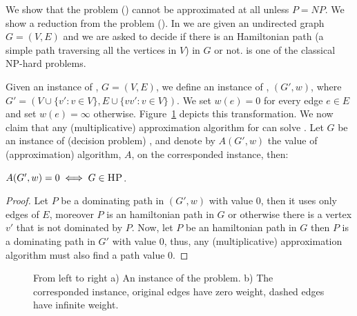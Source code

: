 We show that the \ProblemPath{} problem (\ProbPath{}) cannot be approximated at all
unless $P = NP$.
We show a reduction from the \ProblemHam{} problem (\ProbHam{}).
In \ProbHam{} we are given an undirected graph $G = (V, E)$ and we are 
asked to decide if there is an Hamiltonian path 
(a simple path traversing all the vertices in $V$) in $G$ or not.
\ProbHam{} is one of the classical NP-hard problems.

Given an instance of \ProbHam{}, $G = (V, E)$, we define an instance of \ProbPath{},
$(G', w)$, where $G' = (V \cup \{v' : v \in V\}, E \cup \{vv' : v \in V\})$.
We set $w(e) = 0$ for every edge $e \in E$ and set $w(e) = \infty$ otherwise.
Figure~\ref{fig:hamiltonian} depicts this transformation.  
We now claim that any (multiplicative) approximation algorithm for \ProbPath{}
can solve \ProbHam{}.
Let $G$ be an instance of (decision problem) \ProbHam{}, 
and denote by $A(G', w)$ the value of (approximation) algorithm, $A$, 
on the corresponded \ProbPath{} instance, then:

\begin{claim}
$A(G', w) = 0 \iff G \in \textsc{HP}{}$. 
\end{claim} 

\begin{proof}
Let $P$ be a dominating path in $(G', w)$ with value 0, 
then it uses only edges of $E$, moreover $P$ is an hamiltonian path in $G$ or otherwise
there is a vertex $v'$ that is not dominated by $P$.
Now, let $P$ be an hamiltonian path in $G$ then $P$ is a dominating path in $G'$ with value
0, thus, any (multiplicative) approximation algorithm must also find a path value 0.
\end{proof}


\begin{figure}
\begin{center}

\end{center}
\caption{\label{fig:hamiltonian}
From left to right
a) An instance of the \ProblemHam{} problem.
b) The corresponded \ProblemPath{} instance, 
original edges have zero weight, dashed edges have infinite weight.
}
\end{figure} 